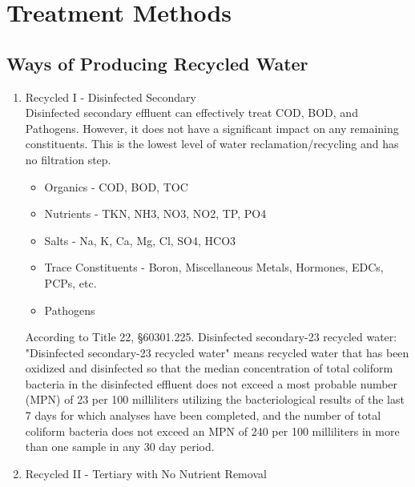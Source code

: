 
\chapter{Treatment Methods}

\section{Ways of Producing Recycled Water} 

\begin{enumerate}

\item Recycled I - Disinfected Secondary\\

Disinfected secondary effluent can effectively treat COD, BOD, and Pathogens.  However, it does not have a significant impact on any remaining constituents.  This is the lowest level of water reclamation/recycling and has no filtration step.
\begin{itemize}
\item Organics - COD, BOD, TOC
\item Nutrients - TKN, NH3, NO3, NO2, TP, PO4
\item Salts - Na, K, Ca, Mg, Cl, SO4, HCO3
\item Trace Constituents - Boron, Miscellaneous Metals, Hormones, EDCs, PCPs, etc.
\item Pathogens
\end{itemize}

According to Title 22, §60301.225. Disinfected secondary-23 recycled water:\\

"Disinfected secondary-23 recycled water" means recycled water that has been oxidized and disinfected so that the median concentration of total coliform bacteria in the disinfected effluent does not exceed a most probable number (MPN) of 23 per 100 milliliters utilizing the bacteriological results of the last 7 days for which analyses have been completed, and the number of total coliform bacteria does not exceed an MPN of 240 per 100 milliliters in more than one sample in any 30 day period.
 
\item Recycled II - Tertiary with No Nutrient Removal\\


\end{enumerate}
